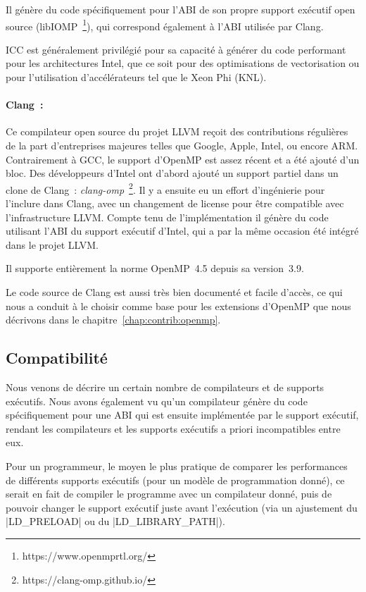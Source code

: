 Il génère du code spécifiquement pour l'ABI de son propre support exécutif open source (libIOMP~\footnote{https://www.openmprtl.org/}), qui correspond également à l'ABI utilisée par Clang.

ICC est généralement privilégié pour sa capacité à générer du code performant pour les architectures Intel, que ce soit pour des optimisations de vectorisation ou pour l'utilisation d'accélérateurs tel que le Xeon Phi (KNL).



\paragraph{Clang~:}
Ce compilateur open source du projet LLVM reçoit des contributions régulières de la part d'entreprises majeures telles que Google, Apple, Intel, ou encore ARM.
Contrairement à GCC, le support d'OpenMP est assez récent et a été ajouté d'un bloc.
Des développeurs d'Intel ont d'abord ajouté un support partiel dans un clone de Clang~: \emph{clang-omp}~\footnote{https://clang-omp.github.io/}.
Il y a ensuite eu un effort d'ingénierie pour l'inclure dans Clang, avec un changement de license pour être compatible avec l'infrastructure LLVM.
Compte tenu de l'implémentation il génère du code utilisant l'ABI du support exécutif d'Intel, qui a par la même occasion été intégré dans le projet LLVM.

Il supporte entièrement la norme OpenMP~4.5 depuis sa version~3.9.

Le code source de Clang est aussi très bien documenté et facile d'accès, ce qui nous a conduit à le choisir comme base pour les extensions d'OpenMP que nous décrivons dans le chapitre~\ref{chap:contrib:openmp}.

\subsection{Compatibilité}\label{sec:rw:compilers:compat}

Nous venons de décrire un certain nombre de compilateurs et de supports exécutifs.
Nous avons également vu qu'un compilateur génère du code spécifiquement pour une ABI qui est ensuite implémentée par le support exécutif, rendant les compilateurs et les supports exécutifs a priori incompatibles entre eux.

Pour un programmeur, le moyen le plus pratique de comparer les performances de différents supports exécutifs (pour un modèle de programmation donné), ce serait en fait de compiler le programme avec un compilateur donné, puis de pouvoir changer le support exécutif juste avant l'exécution (via un ajustement du |LD_PRELOAD| ou du |LD_LIBRARY_PATH|).


